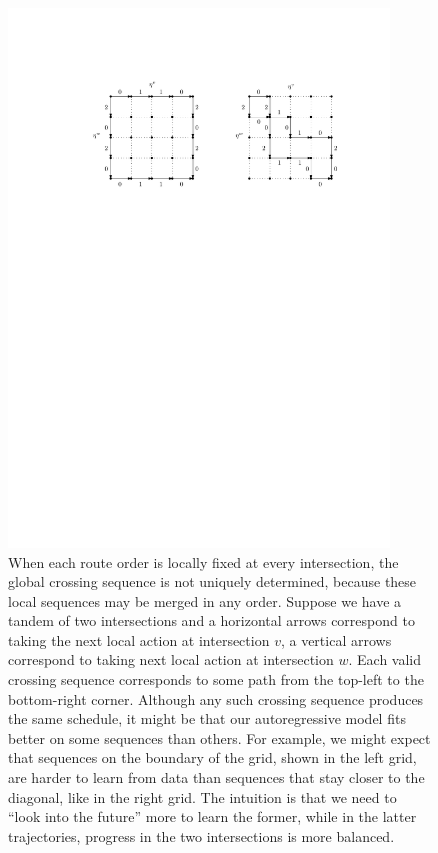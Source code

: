 \documentclass[a4paper]{article}
\theoremstyle{definition}
\theoremstyle{plain}
\begin{document}
\begin{figure}
  \centering
  \includegraphics[width=0.9\textwidth]{figures/network/solution_equivalence}
  \caption{When each route order is locally fixed at every intersection, the
    global crossing sequence is not uniquely determined, because these local
    sequences may be merged in any order. Suppose we have a tandem of two
    intersections and a horizontal arrows correspond to taking the next local
    action at intersection $v$, a vertical arrows correspond to taking next
    local action at intersection $w$. Each valid crossing sequence corresponds
    to some path from the top-left to the bottom-right corner. Although any such
    crossing sequence produces the same schedule, it might be that our
    autoregressive model fits better on some sequences than others. For example,
    we might expect that sequences on the boundary of the grid, shown in the
    left grid, are harder to learn from data than sequences that stay closer to
    the diagonal, like in the right grid. The intuition is that we need to
    ``look into the future'' more to learn the former, while in the latter
    trajectories, progress in the two intersections is more balanced.}
  \label{fig:solution_equivalence}
\end{figure}
\end{document}
